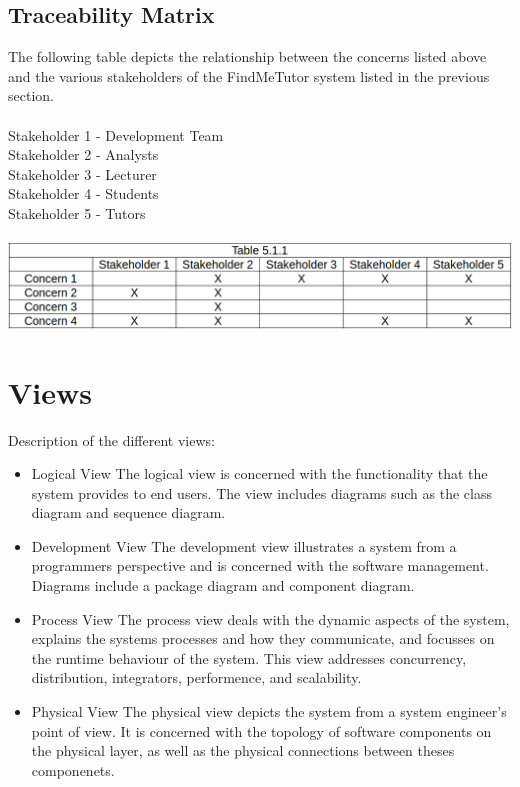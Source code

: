 \documentclass[12pt]{article}
\begin{document}
\subsection{Traceability Matrix}
The following table depicts the relationship between the concerns listed above and the various stakeholders of the FindMeTutor system listed in the previous section.\\\\
Stakeholder 1 - Development Team\\
Stakeholder 2 - Analysts\\
Stakeholder 3 - Lecturer\\
Stakeholder 4 - Students\\
Stakeholder 5 - Tutors\\\\
\includegraphics[width=140mm]{./trace.png}

\section{Views}
Description of the different views:
\begin{itemize}
\item Logical View
The logical view is concerned with the functionality that the system provides to end users. The view includes diagrams such as the class diagram and sequence diagram.
\item Development View
The development view illustrates a system from a programmers perspective and is concerned with the software management. Diagrams include a package diagram and component diagram.
\item Process View
The process view deals with the dynamic aspects of the system, explains the systems processes and how they communicate, and focusses on the runtime behaviour of the system. This view addresses concurrency, distribution, integrators, performence, and scalability.
\item Physical View
The physical view depicts the system from a system engineer's point of view. It is concerned with the topology of software components on the physical layer, as well as the physical connections between theses componenets.
\end{itemize}
\end{document}
